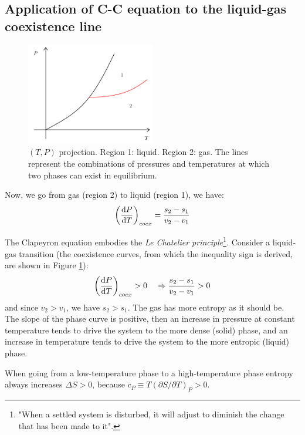 \documentclass[../main/main.tex]{subfiles}
\begin{document}
\subsection{Application of C-C equation to the liquid-gas coexistence line}
\begin{figure}[h!]
\centering
\includegraphics[width=0.5\textwidth]{../lessons/3_image/16.pdf}
\caption{\label{fig:3_16} \( (T,P) \) projection. Region 1: liquid. Region 2: gas. The lines represent the combinations of pressures and temperatures at which two phases can exist in equilibrium.}
\end{figure}

 Now, we go from gas (region 2) to liquid (region 1), we have:
\begin{equation*}
  \qty(\dv{P}{T} )_{coex} = \frac{s_2 - s_1}{v_2 - v_1}
  \label{eq:}
\end{equation*}

The Clapeyron equation embodies the \emph{Le Chatelier principle}\footnote{"When a settled system is disturbed, it will adjust to diminish the change that has been made to it".}.
 Consider a liquid-gas transition (the coexistence curves, from which the inequality sign is derived, are shown in Figure \ref{fig:3_16}):
\begin{equation*}
  \qty(\dv{P}{T} )_{coex} > 0 \quad \Rightarrow \frac{s_2 - s_1}{v_2 - v_1} > 0
\end{equation*}
and since \( v_2 > v_1 \), we have \( s_2 > s_1 \). The gas has more entropy as it should be.  The slope of the phase curve is positive, then an increase in pressure at constant temperature tends to drive the system to the more dense (solid) phase, and an increase in temperature tends to drive the system to the more entropic (liquid) phase.


When going from a low-temperature phase to a high-temperature phase entropy always increases \( \Delta S > 0 \), because \( c_P \equiv T (\partial{S}/\partial{T}  )_P > 0 \).
\end{document}
